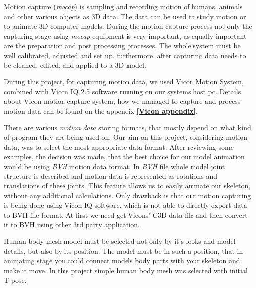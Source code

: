 \documentclass[times, 10pt,twocolumn]{article}
\begin{document}

Motion capture (\emph{mocap}) is sampling and recording motion of humans, animals and other various
objects as 3D data. The data can be used to study motion or to animate 3D computer models.
During the motion capture process not only the capturing stage using \emph{mocap} equipment
is very important, as equally important are the preparation and post processing processes.
The whole system must be well calibrated, adjusted and set up, furthermore, after capturing
data needs to be cleaned, edited, and applied to a 3D model.

During this project, for capturing motion data, we used Vicon Motion System,
combined with Vicon IQ 2.5 software running on our systems host pc.
Details about Vicon motion capture system, how we managed to capture and process motion data can be found on the appendix \textbf{\ref{Vicon appendix}}.


\label{Motion_data}

There are various \emph{motion data} storing formats, that mostly depend on what kind of program they
are being used on. Our aim on this project, considering motion data, was to select
the most appropriate data format. After reviewing some examples, the decision was made,
that the best choice for our model animation would be using \emph{BVH} motion data format.
In \emph{BVH} file whole model joint structure is described and motion data is represented as rotations and translations of these joints. This feature allows us to easily animate our skeleton, without any additional calculations.
Only drawback is that our motion capturing is being done using Vicon IQ software,
which is not able to directly export data to BVH file format. At first we need get Vicons' C3D data file
and then convert it to BVH using other 3rd party application.


\label{Maya_mesh}

Human body mesh model must be selected not only by it's looks and model details,
but also by its position. The model must be in such a position, that in
animating stage you could connect models body parts with your skeleton
and make it move. In this project simple human body mesh was selected with initial T-pose.
\end{document}
